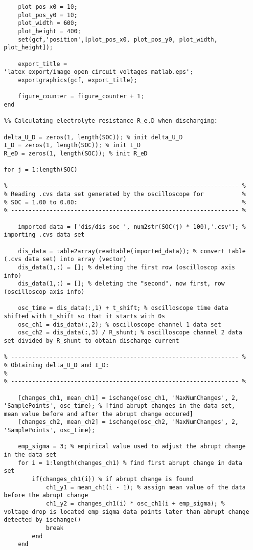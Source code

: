 \begin{lstlisting}
    plot_pos_x0 = 10;
    plot_pos_y0 = 10;
    plot_width = 600;
    plot_height = 400;
    set(gcf,'position',[plot_pos_x0, plot_pos_y0, plot_width, plot_height]);
    
    export_title = 'latex_export/image_open_circuit_voltages_matlab.eps';
    exportgraphics(gcf, export_title);
    
    figure_counter = figure_counter + 1;
end

%% Calculating electrolyte resistance R_e,D when discharging:

delta_U_D = zeros(1, length(SOC)); % init delta_U_D
I_D = zeros(1, length(SOC)); % init I_D
R_eD = zeros(1, length(SOC)); % init R_eD

for j = 1:length(SOC)

% ----------------------------------------------------------------- %
% Reading .cvs data set generated by the oscilloscope for           %
% SOC = 1.00 to 0.00:                                               %
% ----------------------------------------------------------------- %
    
    imported_data = ['dis/dis_soc_', num2str(SOC(j) * 100),'.csv']; % importing .cvs data set

    dis_data = table2array(readtable(imported_data)); % convert table (.cvs data set) into array (vector)
    dis_data(1,:) = []; % deleting the first row (oscilloscop axis info)
    dis_data(1,:) = []; % deleting the "second", now first, row (oscilloscop axis info)

    osc_time = dis_data(:,1) + t_shift; % oscilloscope time data shifted with t_shift so that it starts with 0s
    osc_ch1 = dis_data(:,2); % oscilloscope channel 1 data set
    osc_ch2 = dis_data(:,3) / R_shunt; % oscilloscope channel 2 data set divided by R_shunt to obtain discharge current 
    
% ----------------------------------------------------------------- %
% Obtaining delta_U_D and I_D:                                          %
% ----------------------------------------------------------------- %
    
    [changes_ch1, mean_ch1] = ischange(osc_ch1, 'MaxNumChanges', 2, 'SamplePoints', osc_time); % [find abrupt changes in the data set, mean value before and after the abrupt change occured] 
    [changes_ch2, mean_ch2] = ischange(osc_ch2, 'MaxNumChanges', 2, 'SamplePoints', osc_time);

    emp_sigma = 3; % empirical value used to adjust the abrupt change in the data set 
    for i = 1:length(changes_ch1) % find first abrupt change in data set
        if(changes_ch1(i)) % if abrupt change is found
            ch1_y1 = mean_ch1(i - 1); % assign mean value of the data before the abrupt change
            ch1_y2 = changes_ch1(i) * osc_ch1(i + emp_sigma); % voltage drop is located emp_sigma data points later than abrupt change detected by ischange()
            break
        end
    end


\end{lstlisting}
